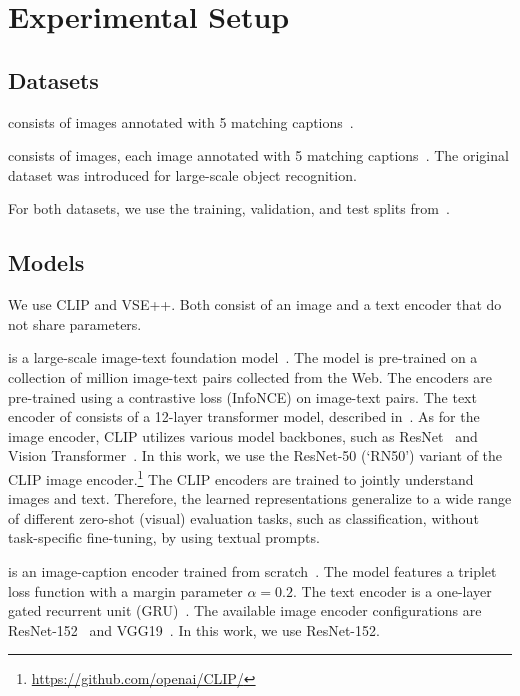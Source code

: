 
\section{Experimental Setup}
\label{app:experimental}

\subsection{Datasets}
\label{app:experimental-datasets}

 consists of  images annotated with 5 matching captions~\citep{young2014image}. 

 consists of  images, each image annotated with 5 matching captions~\citep{lin2014microsoft}.  
The original dataset was introduced for large-scale object recognition.

For both datasets, we use the training, validation, and test splits from~\citep{karpathy2015deep}.

\subsection{Models}
\label{app:experimental-models}

We use CLIP and VSE++. Both consist of an image and a text encoder that do not share parameters.

 is a large-scale image-text foundation model~\citep{radford2021learning}.
The model is pre-trained on a collection of  million image-text pairs collected from the Web. 
The encoders are pre-trained using a contrastive loss (InfoNCE) on image-text pairs.
The text encoder of consists of a 12-layer transformer model, described in~\citep{radford2019language}.
As for the image encoder, CLIP utilizes various model backbones, such as ResNet~\citep{he2016deep}  and Vision Transformer~\citep{dosovitskiy2021image}.
In this work, we use the ResNet-50  (‘RN50’) variant of the CLIP image encoder.\footnote{\url{https://github.com/openai/CLIP/}}
The CLIP encoders are trained to jointly understand images and text.
Therefore, the learned representations generalize to a wide range of different zero-shot (visual) evaluation tasks, such as classification, without task-specific fine-tuning, by using textual prompts. 

 is an image-caption encoder trained from scratch~\citep{faghri2018improving}.
The model features a triplet loss function with a margin parameter $\alpha=0.2$.
The text encoder is a one-layer gated recurrent unit (GRU)~\citep{cho2014_learning}.
The available image encoder configurations are ResNet-152~\citep{he2016deep} and VGG19~\citep{simonyan2015_very_deep}.
In this work, we use ResNet-152.

